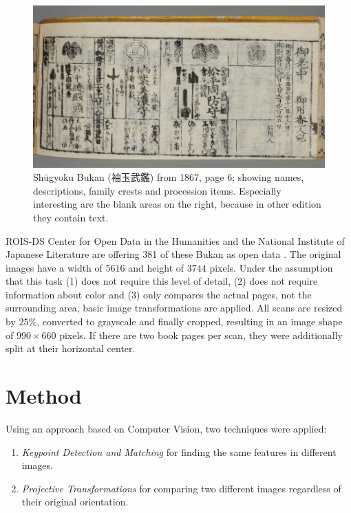 \documentclass{ltjarticle}
\begin{document}
\begin{figure}
    \centering
    \includegraphics[width=\textwidth]{200019649_00006}
    \caption[Shūgyoku Bukan (袖玉武鑑), page 6]{Shūgyoku Bukan (袖玉武鑑) from 1867, page 6; showing names, descriptions, family crests and procession items. Especially interesting are the blank areas on the right, because in other edition they contain text.}
    \label{fig:shuugyokubukan006}
\end{figure}

ROIS-DS Center for Open Data in the Humanities and the National Institute of Japanese Literature are offering 381 of these Bukan as open data \cite{pmjt} \cite{codh2018bukan}. The original images have a width of $5616$ and height of $3744$ pixels. Under the assumption that this task (1) does not require this level of detail, (2) does not require information about color and (3) only compares the actual pages, not the surrounding area, basic image transformations are applied. All scans are resized by $25\%$, converted to grayscale and finally cropped, resulting in an image shape of $990 \times 660$ pixels. If there are two book pages per scan, they were additionally split at their horizontal center.

\section{Method}

Using an approach based on Computer Vision, two techniques were applied:

\begin{enumerate}
    \item \emph{Keypoint Detection and Matching} for finding the same features in different images.
    \item \emph{Projective Transformations} for comparing two different images regardless of their original orientation.
\end{enumerate}
\end{document}
